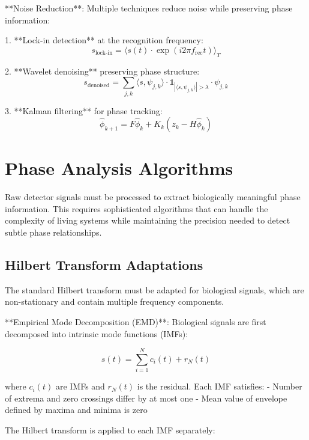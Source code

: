 \documentclass[12pt,a4paper]{report}
\begin{document}
**Noise Reduction**: Multiple techniques reduce noise while preserving phase information:

1. **Lock-in detection** at the recognition frequency:
   \begin{equation}
   s_{\text{lock-in}} = \langle s(t) \cdot \exp(i 2\pi f_{\text{rec}} t) \rangle_T
   \end{equation}

2. **Wavelet denoising** preserving phase structure:
   \begin{equation}
   s_{\text{denoised}} = \sum_{j,k} \langle s, \psi_{j,k} \rangle \cdot \mathbb{1}_{|\langle s, \psi_{j,k} \rangle| > \lambda} \cdot \psi_{j,k}
   \end{equation}

3. **Kalman filtering** for phase tracking:
   \begin{equation}
   \hat{\phi}_{k+1} = F\hat{\phi}_k + K_k(z_k - H\hat{\phi}_k)
   \end{equation}

\section{Phase Analysis Algorithms}

Raw detector signals must be processed to extract biologically meaningful phase information. This requires sophisticated algorithms that can handle the complexity of living systems while maintaining the precision needed to detect subtle phase relationships.

\subsection{Hilbert Transform Adaptations}

The standard Hilbert transform must be adapted for biological signals, which are non-stationary and contain multiple frequency components.

**Empirical Mode Decomposition (EMD)**: Biological signals are first decomposed into intrinsic mode functions (IMFs):

\begin{equation}
s(t) = \sum_{i=1}^{N} c_i(t) + r_N(t)
\end{equation}

where $c_i(t)$ are IMFs and $r_N(t)$ is the residual. Each IMF satisfies:
- Number of extrema and zero crossings differ by at most one
- Mean value of envelope defined by maxima and minima is zero

The Hilbert transform is applied to each IMF separately:
\end{document}
